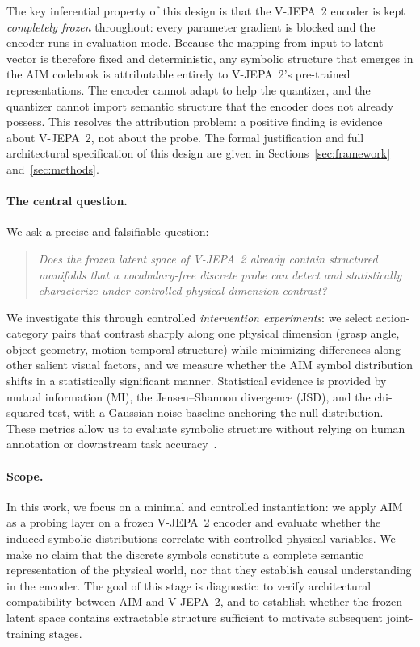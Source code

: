 \documentclass{article}
\begin{document}
The key inferential property of this design is that the V-JEPA~2
encoder is kept \emph{completely frozen} throughout: every parameter
gradient is blocked and the encoder runs in evaluation mode.
Because the mapping from input to latent vector is therefore fixed and
deterministic, any symbolic structure that emerges in the AIM codebook
is attributable entirely to V-JEPA~2's pre-trained representations.
The encoder cannot adapt to help the quantizer, and the quantizer
cannot import semantic structure that the encoder does not already
possess.
This resolves the attribution problem: a positive finding is evidence
about V-JEPA~2, not about the probe.
The formal justification and full architectural specification of this
design are given in Sections~\ref{sec:framework}
and~\ref{sec:methods}.

\paragraph{The central question.}
We ask a precise and falsifiable question:

\begin{quote}
\emph{Does the frozen latent space of V-JEPA~2 already contain
structured manifolds that a vocabulary-free discrete probe can detect
and statistically characterize under controlled physical-dimension contrast?}
\end{quote}

We investigate this through controlled \emph{intervention
experiments}: we select action-category pairs that contrast sharply
along one physical dimension (grasp angle, object geometry, motion
temporal structure) while minimizing differences along other salient
visual factors, and we measure whether the AIM symbol distribution
shifts in a statistically significant manner.
Statistical evidence is provided by mutual information (MI),
the Jensen--Shannon divergence (JSD), and the chi-squared test, with a
Gaussian-noise baseline anchoring the null distribution.
These metrics allow us to evaluate symbolic structure without relying
on human annotation or downstream task accuracy~\cite{hewitt2019structural,
alain2017probing}.

\paragraph{Scope.}
In this work, we focus on a minimal and controlled instantiation:
we apply AIM as a probing layer on a frozen V-JEPA~2 encoder and
evaluate whether the induced symbolic distributions correlate with
controlled physical variables.
We make no claim that the discrete symbols constitute a complete
semantic representation of the physical world, nor that they establish
causal understanding in the encoder.
The goal of this stage is diagnostic: to verify architectural
compatibility between AIM and V-JEPA~2, and to establish whether the
frozen latent space contains extractable structure sufficient to
motivate subsequent joint-training stages.
\end{document}
